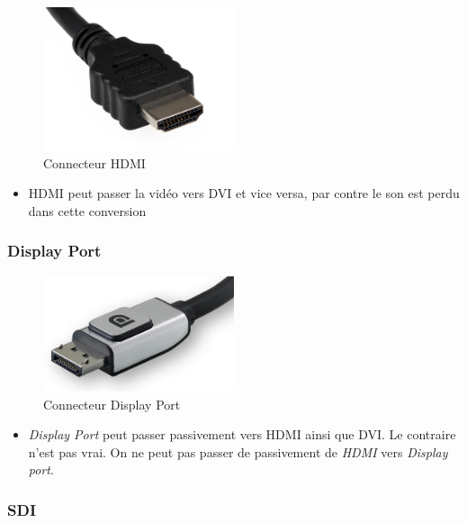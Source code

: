 \documentclass[
  french,
]{book}
\providecommand{\tightlist}{%
  \setlength{\itemsep}{0pt}\setlength{\parskip}{0pt}}
\begin{document}
\begin{figure}
\centering
\includegraphics[width=0.5\textwidth,height=\textheight]{medias/lexique/signaux/numerique/hdmi.jpg}
\caption{Connecteur HDMI}
\end{figure}

\begin{itemize}
\tightlist
\item
  HDMI peut passer la vidéo vers DVI et vice versa, par contre le son est perdu dans cette conversion
\end{itemize}

\hypertarget{display-port}{%
\subsubsection{Display Port}\label{display-port}}

\begin{figure}
\centering
\includegraphics[width=0.5\textwidth,height=\textheight]{medias/lexique/signaux/numerique/displayport.jpg}
\caption{Connecteur Display Port}
\end{figure}

\begin{itemize}
\tightlist
\item
  \emph{Display Port } peut passer passivement vers HDMI ainsi que DVI. Le contraire n'est pas vrai. On ne peut pas passer de passivement de \emph{HDMI} vers \emph{Display port}.
\end{itemize}

\hypertarget{sdi}{%
\subsubsection{SDI}\label{sdi}}
\end{document}
